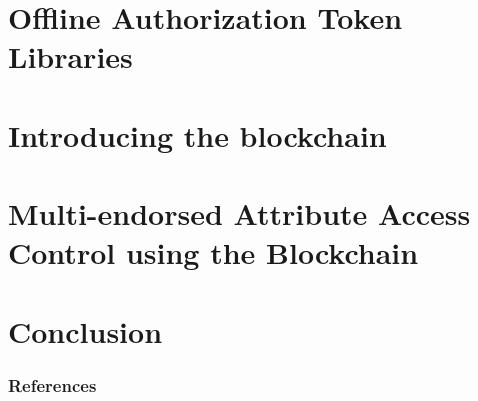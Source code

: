 \documentclass[table]{beamer}
\begin{document}
\section[OATL]{Offline Authorization Token Libraries}




\section{Introducing the blockchain}




\section[MAAC-B]{Multi-endorsed Attribute Access Control using the Blockchain}




\section{Conclusion}



\begin{frame}[allowframebreaks]
        \frametitle{References}
        
        
\end{frame}
\end{document}
